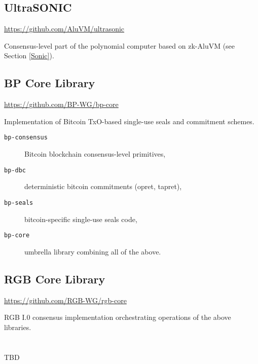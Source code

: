 \documentclass[9pt,oneside]{amsart}
\begin{document}
\subsection{UltraSONIC}

\url{https://github.com/AluVM/ultrasonic}

Consensus-level part of the polynomial computer based on zk-AluVM (see Section \ref{Sonic}).

\subsection{BP Core Library}

\url{https://github.com/BP-WG/bp-core}

Implementation of Bitcoin TxO-based single-use seals and commitment schemes.

\begin{description}
    \item[\texttt{bp-consensus}]  Bitcoin blockchain consensus-level primitives,
    \item[\texttt{bp-dbc}] deterministic bitcoin commitments (opret, tapret),
    \item[\texttt{bp-seals}] bitcoin-specific single-use seals code,
    \item[\texttt{bp-core}] umbrella library combining all of the above.
\end{description}

\subsection{RGB Core Library}

\url{https://github.com/RGB-WG/rgb-core}

RGB I.0 consensus implementation orchestrating operations of the above libraries.


\newpage
\section{}\label{ap:gloss}
\printglossaries

TBD
\end{document}
